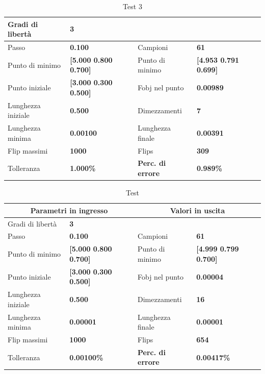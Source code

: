 \documentclass[a4paper, 11pt]{article}
\begin{document}
\begin{table}[h]
    \caption{Test 3}
    \begin{center}
    \begin{tabular}{|l|l|l|l|} 
    \hline 
Gradi di libertà & \textbf{3} &  &  \\ \hline 
Passo & \textbf{0.100} & Campioni & \textbf{61} \\ \hline 
Punto di minimo & \textbf{{[}5.000 0.800 0.700{]}} & Punto di minimo &
\textbf{{[}4.953 0.791 0.699{]}} \\ \hline 
Punto iniziale & \textbf{{[}3.000 0.300 0.500{]}} & Fobj nel punto &
\textbf{0.00989} \\ \hline 
Lunghezza iniziale & \textbf{0.500} & Dimezzamenti & \textbf{7} \\ \hline 
Lunghezza minima & \textbf{0.00100} & Lunghezza finale & \textbf{0.00391} \\
\hline
Flip massimi & \textbf{1000} & Flips & \textbf{309} \\ \hline 
Tolleranza & \textbf{1.000\%} & \textbf{Perc. di errore} & \textbf{0.989\%} \\
\hline 
    \end{tabular}
    \end{center}
    \end{table}

    \begin{table}[h]
        \caption{Test}
        \begin{center}
        \begin{tabular}{|l|l|l|l|} 
        \hline 
        \multicolumn{2}{|c|}{\textbf{Parametri in ingresso}} & \multicolumn{2}{c|}{\textbf{Valori in uscita}} \\ \hline
        Gradi di libertà  & \textbf{3} &  &  \\ \hline 
        Passo & \textbf{0.100} & Campioni & \textbf{61} \\ \hline 
        Punto di minimo & \textbf{{[}5.000 0.800 0.700{]}} & Punto di minimo & \textbf{{[}4.999 0.799 0.700{]}} \\ \hline 
        Punto iniziale & \textbf{{[}3.000 0.300 0.500{]}} & Fobj nel punto & \textbf{0.00004} \\ \hline 
        Lunghezza iniziale & \textbf{0.500} & Dimezzamenti & \textbf{16} \\ \hline 
        Lunghezza minima & \textbf{0.00001} & Lunghezza finale & \textbf{0.00001} \\ \hline
        Flip massimi & \textbf{1000} & Flips & \textbf{654} \\ \hline 
        Tolleranza & \textbf{0.00100\%} & \textbf{Perc. di errore} & \textbf{0.00417\%} \\ \hline 
        \end{tabular}
        \end{center}
        \end{table}
\end{document}
